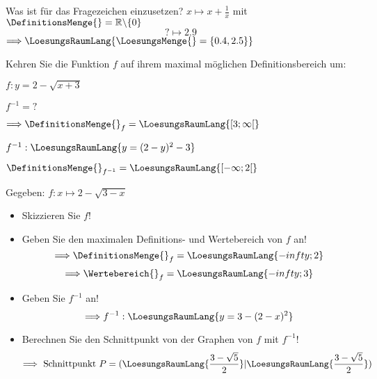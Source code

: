 \begin{bbwAufgabenBlock}
\item Was ist für das Fragezeichen einzusetzen? $x \mapsto x+\frac1x$ mit $\DefinitionsMenge{}
= \mathbb{R}\backslash \{0\}$
$$? \mapsto 2.9$$
$\Longrightarrow \LoesungsRaumLang{\LoesungsMenge{} = \{0.4, 2.5\}}$

\item Kehren Sie die Funktion $f$ auf ihrem maximal möglichen
Definitionsbereich um:

$f: y=2-\sqrt{x+3}$

$f^{-1} = ?$


$\Longrightarrow \DefinitionsMenge{}_f = \LoesungsRaumLang{[3;\infty[}$

$f^{-1}: \LoesungsRaumLang{y = (2-y)^2 - 3}$

$\DefinitionsMenge{}_{f^{-1}} = \LoesungsRaumLang{[-\infty; 2[}$


\item Gegeben: $f: x\mapsto 2-\sqrt{3-x}$

\begin{itemize}
\item Skizzieren Sie $f$!
\item Geben Sie den maximalen Definitions- und Wertebereich von $f$ an!
  $$\Longrightarrow \DefinitionsMenge{}_f = \LoesungsRaumLang{-infty;2}$$
  $$\Longrightarrow \Wertebereich{}_f = \LoesungsRaumLang{-infty;3}$$
\item Geben Sie $f^{-1}$ an!
  $$\Longrightarrow f^{-1}: \LoesungsRaumLang{y=3-(2-x)^2}$$
\item Berechnen Sie den Schnittpunkt von der Graphen von $f$ mit
$f^{-1}$!
  $$\Longrightarrow \textrm{ Schnittpunkt } P=(\LoesungsRaumLang{\frac{3-\sqrt{5}}2}|\LoesungsRaumLang{\frac{3-\sqrt{5}}2})$$

\end{itemize}
\end{bbwAufgabenBlock}

\platzFuerBerechnungenBisEndeSeite{}


\platzFuerBerechnungenBisEndeSeite{}




